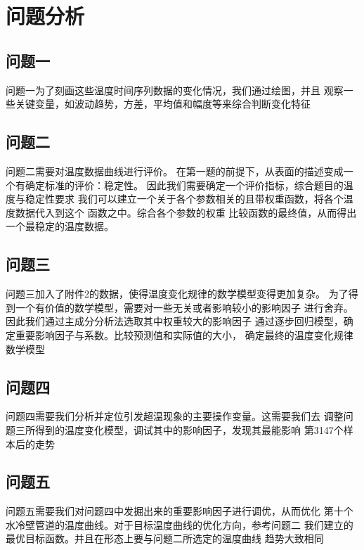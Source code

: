 \section{问题分析}
    \subsection{问题一}
    问题一为了刻画这些温度时间序列数据的变化情况，我们通过绘图，并且
    观察一些关键变量，如波动趋势，方差，平均值和幅度等来综合判断变化特征
    \subsection{问题二}
    问题二需要对温度数据曲线进行评价。
    在第一题的前提下，从表面的描述变成一个有确定标准的评价：稳定性。
    因此我们需要确定一个评价指标，综合题目的温度与稳定性要求
    我们可以建立一个关于各个参数相关的且带权重函数，将各个温度数据代入到这个
    函数之中。综合各个参数的权重
    比较函数的最终值，从而得出一个最稳定的温度数据。
    \subsection{问题三}
    问题三加入了附件2的数据，使得温度变化规律的数学模型变得更加复杂。
    为了得到一个有价值的数学模型，需要对一些无关或者影响较小的影响因子
    进行舍弃。因此我们通过主成分分析法选取其中权重较大的影响因子
    通过逐步回归模型，确定重要影响因子与系数。比较预测值和实际值的大小，
    确定最终的温度变化规律数学模型
    \subsection{问题四}
    问题四需要我们分析并定位引发超温现象的主要操作变量。这需要我们去
    调整问题三所得到的温度变化模型，调试其中的影响因子，发现其最能影响
    第3147个样本后的走势
    \subsection{问题五}
    问题五需要我们对问题四中发掘出来的重要影响因子进行调优，从而优化
    第十个水冷壁管道的温度曲线。对于目标温度曲线的优化方向，参考问题二
    我们建立的最优目标函数。并且在形态上要与问题二所选定的温度曲线
    趋势大致相同


